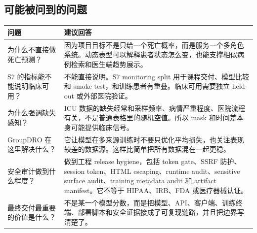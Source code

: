 \documentclass[11pt,a4paper]{article}
\begin{document}
\subsection*{可能被问到的问题}
\begin{longtable}{@{}p{}p{}@{}}
\toprule
\textbf{问题} & \textbf{建议回答}\\
\midrule
为什么不直接做死亡预测？ &
因为项目目标不是只给一个死亡概率，而是服务一个多角色系统。动态表型可以解释患者状态怎么变，也能支撑相似病例检索和医生端趋势展示。\\
\addlinespace
S7 的指标能不能说明临床可用？ &
不能直接说明。S7 monitoring split 用于课程交付、模型比较和 smoke test，和训练患者有重叠。临床可用需要独立 held-out 或外部医院验证。\\
\addlinespace
为什么强调缺失感知？ &
ICU 数据的缺失经常和采样频率、病情严重程度、医院流程有关，不是普通表格里的随机空值。所以 mask 和时间差本身可能提供临床信号。\\
\addlinespace
GroupDRO 在这里解决什么？ &
它让模型在多来源训练时不要只优化平均损失，也关注表现较差的数据源。这样比简单把所有数据混在一起更稳。\\
\addlinespace
安全审计做到什么程度？ &
做到工程 release hygiene，包括 token gate、SSRF 防护、session token、HTML escaping、runtime audit、sensitive surface audit、training metadata audit 和 artifact manifest。它不等于 HIPAA、IRB、FDA 或医疗器械认证。\\
\addlinespace
最终交付最重要的价值是什么？ &
不是某一个模型分数，而是把模型、API、客户端、训练终端、部署脚本和安全证据接成了可复现链路，并且把边界写清楚了。\\
\bottomrule
\end{longtable}
\end{document}
